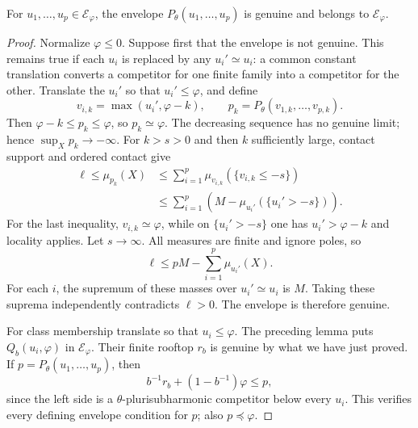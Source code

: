 \begin{proposition}\label{prop:big-relative-finite-rooftops}
For $u_1,\ldots,u_p\in\mathcal E_\varphi$, the envelope $P_\theta(u_1,\ldots,u_p)$ is genuine and belongs to $\mathcal E_\varphi$.
\end{proposition}
\begin{proof}
Normalize $\varphi\leq0$. Suppose first that the envelope is not genuine. This remains true if each $u_i$ is replaced by any $u_i'\simeq u_i$: a common constant translation converts a competitor for one finite family into a competitor for the other. Translate the $u_i'$ so that $u_i'\leq\varphi$, and define
\[
 v_{i,k}=\max(u_i',\varphi-k),\qquad
 p_k=P_\theta(v_{1,k},\ldots,v_{p,k}).
\]
Then $\varphi-k\leq p_k\leq\varphi$, so $p_k\simeq\varphi$. The decreasing sequence has no genuine limit; hence $\sup_Xp_k\to-\infty$. For $k>s>0$ and then $k$ sufficiently large, contact support and ordered contact give
\[
 \begin{split}
 \ell\leq\mu_{p_k}(X)
 &\leq\sum_{i=1}^p\mu_{v_{i,k}}(\{v_{i,k}\leq-s\})\\
 &\leq\sum_{i=1}^p
       \left(M-\mu_{u_i'}(\{u_i'>-s\})\right).
 \end{split}
\]
For the last inequality, $v_{i,k}\simeq\varphi$, while on $\{u_i'>-s\}$ one has $u_i'>\varphi-k$ and locality applies. Let $s\to\infty$. All measures are finite and ignore poles, so
\[
 \ell\leq pM-\sum_{i=1}^p\mu_{u_i'}(X).
\]
For each $i$, the supremum of these masses over $u_i'\simeq u_i$ is $M$. Taking these suprema independently contradicts $\ell>0$. The envelope is therefore genuine.

For class membership translate so that $u_i\leq\varphi$. The preceding lemma puts $Q_b(u_i,\varphi)$ in $\mathcal E_\varphi$. Their finite rooftop $r_b$ is genuine by what we have just proved. If $p=P_\theta(u_1,\ldots,u_p)$, then
\[
 b^{-1}r_b+(1-b^{-1})\varphi\leq p,
\]
since the left side is a $\theta$-plurisubharmonic competitor below every $u_i$. This verifies every defining envelope condition for $p$; also $p\preceq\varphi$.
\end{proof}

